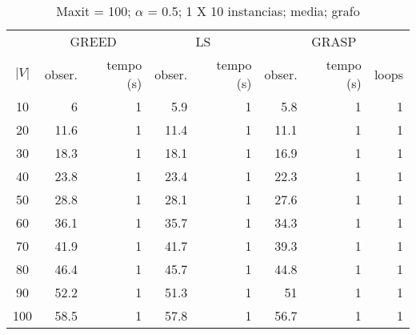 \documentclass[]{article}
\begin{document}
\begin {table}[ht]
\centering
\caption{Maxit = 100; $\alpha$ = 0.5; 1 X 10 instancias; media; grafo}
\begin{small}
	\begin{tabular}{|c|r|r|r|r|r|r|r|}
		\hline
		& \multicolumn{2}{c|}{GREED} & \multicolumn{2}{c|}{LS} & \multicolumn{3}{c|}{GRASP} \\ 
		\cline{2-8}
		$|V|$   &  obser. & tempo (s)  & obser. & tempo (s) & obser. & tempo (s) & loops\\ 
		\hline
		10 & 6 & 1 & 5.9 & 1 & 5.8 & 1 & 1 \\ 
		20 & 11.6 & 1 & 11.4 & 1 & 11.1 & 1 & 1 \\ 
		30 & 18.3 & 1 & 18.1 & 1 & 16.9 & 1 & 1 \\ 
		40 & 23.8 & 1 & 23.4 & 1 & 22.3 & 1 & 1 \\ 
		50 & 28.8 & 1 & 28.1 & 1 & 27.6 & 1 & 1 \\ 
		60 & 36.1 & 1 & 35.7 & 1 & 34.3 & 1 & 1 \\ 
		70 & 41.9 & 1 & 41.7 & 1 & 39.3 & 1 & 1 \\ 
		80 & 46.4 & 1 & 45.7 & 1 & 44.8 & 1 & 1 \\ 
		90 & 52.2 & 1 & 51.3 & 1 & 51 & 1 & 1 \\ 
		100 & 58.5 & 1 & 57.8 & 1 & 56.7 & 1 & 1 \\ 
		\hline
	\end{tabular} \label{}
\end{small}
\end{table}
\end{document}
